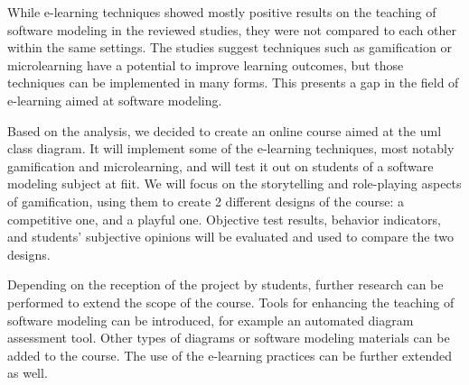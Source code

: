 While e-learning techniques showed mostly positive results on the teaching of software modeling in the reviewed studies, they were not compared to each other within the same settings. The studies suggest techniques such as gamification or microlearning have a potential to improve learning outcomes, but those techniques can be implemented in many forms. This presents a gap in the field of e-learning aimed at software modeling.

Based on the analysis, we decided to create an online course aimed at the \ac{uml} class diagram. It will implement some of the e-learning techniques, most notably gamification and microlearning, and will test it out on students of a software modeling subject at \ac{fiit}. We will focus on the storytelling and role-playing aspects of gamification, using them to create 2 different designs of the course: a competitive one, and a playful one. Objective test results, behavior indicators, and students' subjective opinions will be evaluated and used to compare the two designs.


Depending on the reception of the project by students, further research can be performed to extend the scope of the course. Tools for enhancing the teaching of software modeling can be introduced, for example an automated diagram assessment tool. Other types of diagrams or software modeling materials can be added to the course. The use of the e-learning practices can be further extended as well. 

